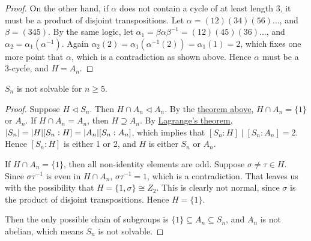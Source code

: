 \begin{proof}
    On the other hand, if \(\alpha\) does not contain a cycle of at least length 3,
    it must be a product of disjoint transpositions.
    Let \(\alpha = (12)(34)(56)\hdots\), and \(\beta = (345)\).
    By the same logic, let \(\alpha_1 = \beta\alpha\beta^{-1} = (12)(45)(36)\hdots\),
    and \(\alpha_2 = \alpha_1(\alpha^{-1})\).
    Again \(\alpha_2(2) = \alpha_1(\alpha^{-1}(2)) = \alpha_1(1) = 2\),
    which fixes one more point that \(\alpha\),
    which is a contradiction as shown above.
    Hence \(\alpha\) must be a 3-cycle,
    and \(H = A_n\).
\end{proof}
\begin{corollary}\label{cor:sn-not-solvable}
    \(S_n\) is not solvable for \(n \geq 5\).
\end{corollary}
\begin{proof}
    Suppose \(H \lhd S_n\).
    Then \(H \cap A_n \lhd A_n\).
    By the \hyperref[thm:an-simple]{theorem above},
    \(H \cap A_n = \{1\}\) or \(A_n\).
    If \(H \cap A_n = A_n\), then \(H \supseteq A_n\).
    By \hyperref[thm:lagrange]{Lagrange's theorem},
    \(\abs{S_n} = \abs{H}[S_n:H] = \abs{A_n}[S_n:A_n]\),
    which implies that \([S_n:H] \mid [S_n:A_n] = 2\).
    Hence \([S_n:H]\) is either 1 or 2,
    and \(H\) is either \(S_n\) or \(A_n\).

    If \(H \cap A_n = \{1\}\),
    then all non-identity elements are odd.
    Suppose \(\sigma\neq\tau \in H\).
    Since \(\sigma\tau^{-1}\) is even in \(H \cap A_n\),
    \(\sigma\tau^{-1} = 1\), which is a contradiction.
    That leaves us with the possibility that \(H = \{1,\sigma\} \cong Z_2\).
    This is clearly not normal, since \(\sigma\) is the product of disjoint transpositions.
    Hence \(H = \{1\}\).

    Then the only possible chain of subgroups is \(\{1\} \subseteq A_n \subseteq S_n\),
    and \(A_n\) is not abelian, which means \(S_n\) is not solvable.
\end{proof}
